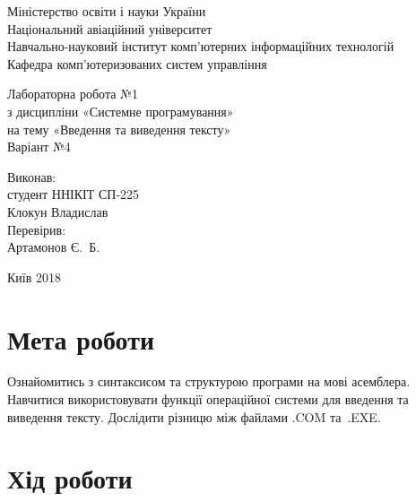 \documentclass[a4paper,oneside,DIV=12,12pt]{scrartcl}
\begin{document}
	\begin{titlepage}
	\centering
		Міністерство освіти і науки України\\
		Національний авіаційний університет\\
		Навчально-науковий інститут комп'ютерних інформаційних технологій\\
		Кафедра комп'ютеризованих систем управління

		\vspace{\fill}

		Лабораторна робота №1\\
		з дисципліни «Системне програмування»\\
		на тему «Введення та виведення тексту»\\
		Варіант №4

		\vspace{\fill}
		
		\begin{flushright}
			Виконав:\\
			студент ННІКІТ СП-225\\
			Клокун Владислав\\
			Перевірив:\\
			Артамонов Є.~Б.
		\end{flushright}

		Київ 2018
    \end{titlepage}
	
	\section{Мета роботи}
		Ознайомитись з синтаксисом та структурою програми на мові асемблера. Навчитися використовувати функції операційної системи для введення та виведення тексту. Дослідити різницю між файлами .COM та~.EXE.
		
	\section{Хід роботи}
				
				
\end{document}
